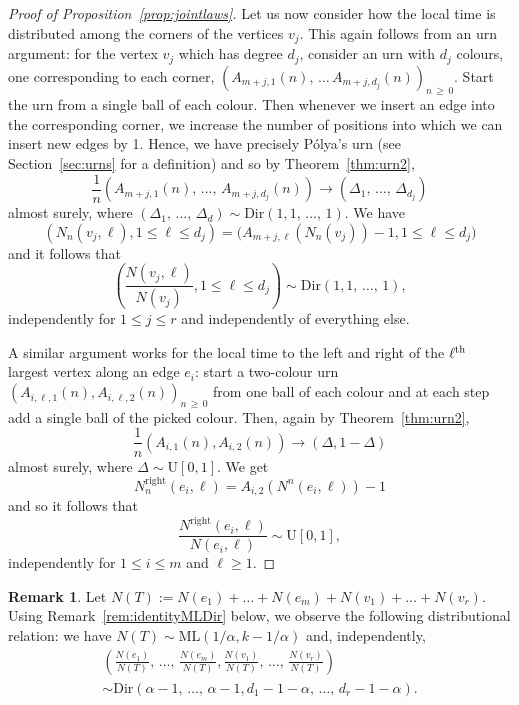 \documentclass[10pt]{amsart}
\theoremstyle{definition}\newtheorem{defi}[theo]{Definition}\newtheorem{rema}[theo]{Remark}\newtheorem{exam}[theo]{Example}\newtheorem{exem}[theo]{Example}\newtheorem{nota}[theo]{Notation}
\newcommand{\ML}{\mathrm{ML}}
\newcommand{\Rightll}{\mathrm{right}}
\newcommand{\rmU}{\mathrm{U}}
\newcommand{\Dir}{\mathrm{Dir}}
\begin{document}
\begin{proof}[Proof of Proposition~\ref{prop:jointlaws}]
Let us now consider how the local time is distributed among the corners of the vertices $v_j$. This again follows from an urn argument: for the vertex $v_j$ which has degree $d_j$, consider an urn with $d_j$ colours, one corresponding to each corner, $(A_{m+j,1}(n),\,\ldots\,A_{m+j, d_j}(n))_{n\,\ge\,0}$. Start the urn from a single ball of each colour. Then whenever we insert an edge into the corresponding corner, we increase the number of positions into which we can insert new edges by 1. Hence, we have precisely P\'olya's urn (see Section~\ref{sec:urns} for a definition) and so by Theorem~\ref{thm:urn2},
\[
\frac{1}{n} \left(A_{m+j,1}(n),\,\ldots,\, A_{m+j,d_j}(n)\right) \to \left(\Delta_1,\,\ldots,\, \Delta_{d_j}\right)
\]
almost surely, where $(\Delta_1,\,\ldots,\,\Delta_d) \sim \Dir(1,1,\,\ldots,\,1)$. We have
\[
\left(N_n\left(v_j,\ell\right), 1 \le \ell \le d_j\right) = \big(A_{m+j,\ell}\left(N_n(v_j)\right) - 1, 1 \le \ell \le d_j\big)
\]
and it follows that
\[
\left(\frac{N(v_j,\ell)}{N(v_j)}, 1 \le \ell \le d_j\right) \sim \Dir(1,1,\,\ldots,\,1),
\]
independently for $1 \le j \le r$ and independently of everything else.

A similar argument works for the local time to the left and right of the $\ell^{\rm th}$ largest vertex along an edge $e_i$: start a two-colour urn $(A_{i,\ell,1}(n), A_{i,\ell,2}(n))_{n\,\ge\,0}$ from one ball of each colour and at each step add a single ball of the picked colour. Then, again by Theorem~\ref{thm:urn2},
\[
\frac{1}{n} \left(A_{i,1}(n), A_{i,2}(n)\right) \to (\Delta,1-\Delta)
\]
almost surely, where $\Delta \sim \rmU[0,1]$. We get
\[
N^{\Rightll}_n\left(e_i,\ell\right) = A_{i, 2}\left(N^n\left(e_i, \ell\right)\right) - 1
\]
and so it follows that
\[
\frac{N^{\Rightll}(e_i,\ell)}{N(e_i,\ell)} \sim \rmU[0,1],
\]
independently for $1 \le i \le m$ and $\ell \ge 1$.
\end{proof}

\begin{rema}\label{rem:distribution temps local aretes et noeuds}
Let $N(T):=N(e_1)+\dots+N(e_m)+N(v_1)+\dots+N(v_r)$. Using Remark~\ref{rem:identityMLDir} below, we observe the following distributional relation: we have $N(T)\sim \ML(1/\alpha, k-1/\alpha)$ and, independently,
\begin{multline*}
\left(\frac{N(e_1)}{N(T)},\,\dots,\,\frac{N(e_m)}{N(T)},\frac{N(v_1)}{N(T)},\,\dots,\,\frac{N(v_r)}{N(T)}\right)\\
\sim \Dir\left(\alpha-1,\,\dots,\,\alpha-1,d_1-1-\alpha,\,\dots,\,d_r-1-\alpha\right).
\end{multline*}
\end{rema}
\end{document}
